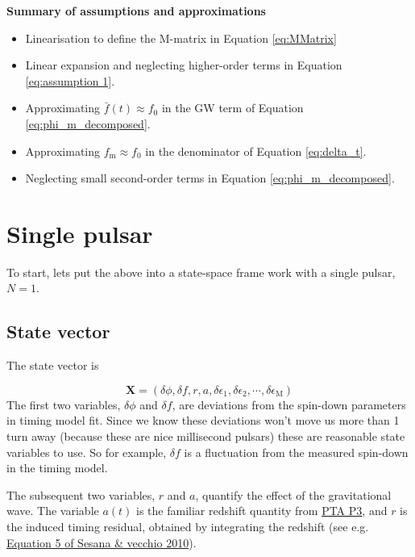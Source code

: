 \documentclass[]{scrartcl}
\begin{document}
\textbf{Summary of assumptions and approximations }
\begin{itemize}
	\item  Linearisation to define the M-matrix in Equation \eqref{eq:MMatrix}
	\item Linear expansion and neglecting higher-order terms in Equation \eqref{eq:assumption 1}.
	\item Approximating $\bar{f}(t) \approx f_0$ in the GW term of Equation \eqref{eq:phi_m_decomposed}.
	\item Approximating $f_{\text{m}} \approx f_0$ in the denominator of Equation \eqref{eq:delta_t}.
	\item Neglecting small second-order terms in Equation \eqref{eq:phi_m_decomposed}.

\end{itemize}





\section{Single pulsar}\label{sec:single_pulsar}
To start, lets put the above into a state-space frame work with a single pulsar, $N=1$. \newline 

\subsection{State vector}

\noindent The state vector is 

\begin{equation}
	\boldsymbol{X} = \left(\delta \phi, \delta f, r,a,\delta \epsilon_1, \delta \epsilon_2, \cdots, \delta \epsilon_{\mathrm M} \right)
\end{equation}
The first two variables, $\delta \phi$ and $\delta f$, are deviations from the spin-down parameters in timing model fit. Since we know these deviations won’t move us more than 1 turn away (because these are nice millisecond pulsars) these are reasonable state variables to use. So for example, $\delta f$ is a fluctuation from the measured spin-down in the timing model. \newline 


\noindent The subsequent two variables, $r$ and $a$, quantify the effect of the gravitational wave. The variable $a(t)$ is the familiar redshift quantity from \href{https://arxiv.org/abs/2501.06990}{PTA P3}, and $r$ is the induced timing residual, obtained by integrating the redshift (see e.g. \href{https://arxiv.org/abs/1003.0677}{Equation 5 of Sesana \& vecchio 2010}). \newline 
\end{document}
